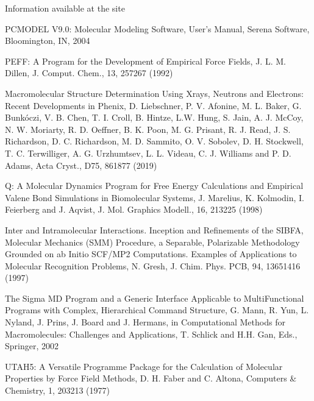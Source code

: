 \documentclass[letterpaper,11pt,english]{sphinxmanual}
\begin{document}
Information available at the site 


PCMODEL V9.0: Molecular Modeling Software, User’s Manual, Serena Software, Bloomington, IN, 2004


PEFF: A Program for the Development of Empirical Force Fields, J. L. M. Dillen, J. Comput. Chem., 13, 257\sphinxhyphen{}267 (1992)


Macromolecular Structure Determination Using X\sphinxhyphen{}rays, Neutrons and Electrons: Recent Developments in Phenix, D. Liebschner, P. V. Afonine, M. L. Baker, G. Bunkóczi, V. B. Chen, T. I. Croll, B. Hintze, L.\sphinxhyphen{}W. Hung, S. Jain, A. J. McCoy, N. W. Moriarty, R. D. Oeffner, B. K. Poon, M. G. Prisant, R. J. Read, J. S. Richardson, D. C. Richardson, M. D. Sammito, O. V. Sobolev, D. H. Stockwell, T. C. Terwilliger, A. G. Urzhumtsev, L. L. Videau, C. J. Williams and P. D. Adams, Acta Cryst., D75, 861\sphinxhyphen{}877 (2019)


Q: A Molecular Dynamics Program for Free Energy Calculations and Empirical Valene Bond Simulations in Biomolecular Systems, J. Marelius, K. Kolmodin, I. Feierberg and J. Aqvist, J. Mol. Graphics Modell., 16, 213\sphinxhyphen{}225 (1998)


Inter\sphinxhyphen{} and Intramolecular Interactions. Inception and Refinements of the SIBFA, Molecular Mechanics (SMM) Procedure, a Separable, Polarizable Methodology Grounded on ab Initio SCF/MP2 Computations. Examples of Applications to Molecular Recognition Problems, N. Gresh, J. Chim. Phys. PCB, 94, 1365\sphinxhyphen{}1416 (1997)


The Sigma MD Program and a Generic Interface Applicable to Multi\sphinxhyphen{}Functional Programs with Complex, Hierarchical Command Structure, G. Mann, R. Yun, L. Nyland, J. Prins, J. Board and J. Hermans, in Computational Methods for Macromolecules: Challenges and Applications, T. Schlick and H.\sphinxhyphen{}H. Gan, Eds., Springer, 2002


UTAH5: A Versatile Programme Package for the Calculation of Molecular Properties by Force Field Methods, D. H. Faber and C. Altona, Computers \& Chemistry, 1, 203\sphinxhyphen{}213 (1977)
\end{document}
